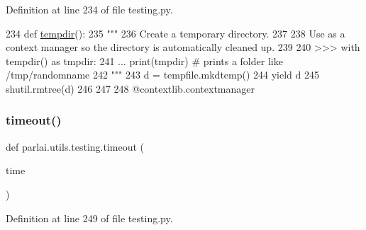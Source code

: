 Definition at line 234 of file testing.\+py.


\begin{DoxyCode}
234 \textcolor{keyword}{def }\hyperlink{namespaceparlai_1_1utils_1_1testing_a0945b769a10c0c844b29c02ff26445a5}{tempdir}():
235     \textcolor{stringliteral}{"""}
236 \textcolor{stringliteral}{    Create a temporary directory.}
237 \textcolor{stringliteral}{}
238 \textcolor{stringliteral}{    Use as a context manager so the directory is automatically cleaned up.}
239 \textcolor{stringliteral}{}
240 \textcolor{stringliteral}{    >>> with tempdir() as tmpdir:}
241 \textcolor{stringliteral}{    ...    print(tmpdir)  # prints a folder like /tmp/randomname}
242 \textcolor{stringliteral}{    """}
243     d = tempfile.mkdtemp()
244     \textcolor{keywordflow}{yield} d
245     shutil.rmtree(d)
246 
247 
248 @contextlib.contextmanager
\end{DoxyCode}
\mbox{\label{namespaceparlai_1_1utils_1_1testing_aa8539ab1d17813b0c17f08700b2c2c2e}} 
\subsubsection{\texorpdfstring{timeout()}{timeout()}}
{\footnotesize\ttfamily def parlai.\+utils.\+testing.\+timeout (\begin{DoxyParamCaption}\item[{}]{time }\end{DoxyParamCaption})}



Definition at line 249 of file testing.\+py.


